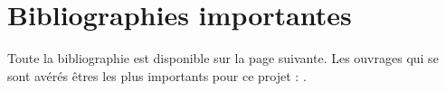 \documentclass[12pt]{report}
\begin{document}
  \section{Bibliographies importantes}
  Toute la bibliographie est disponible sur la page suivante.
  Les ouvrages qui se sont avérés êtres les plus importants pour ce projet : \cite{nsga2} \cite{culiolo} \cite{inspyred}.




  \nocite{*} %
  
  
\end{document}
